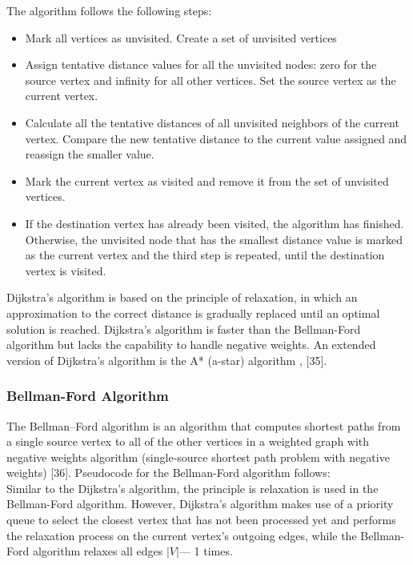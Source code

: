 \documentclass[10pt,11pt,12pt,oneside]{book}
\begin{document}
	The algorithm follows the following steps:\\
	\begin{itemize}
		\item {Mark all vertices as unvisited. Create a set of unvisited vertices}
		\item {Assign tentative distance values for all the unvisited nodes: zero for the source vertex and infinity for all other vertices. Set the source vertex as the current vertex.}
		\item {Calculate all the tentative distances of all unvisited neighbors of the current vertex. Compare the new tentative distance to the current value assigned and reassign the smaller value.}
		\item {Mark the current vertex as visited and remove it from the set of unvisited vertices.}
		\item {If the destination vertex has already been visited, the algorithm has finished. Otherwise, the unvisited node that has the smallest distance value is marked as the current vertex and the third step is repeated, until the destination vertex is visited. }
	\end{itemize}
	
	Dijkstra’s algorithm is based on the principle of relaxation, in which an approximation to the correct distance is gradually replaced until an optimal solution is reached. Dijkstra’s algorithm is faster than the Bellman-Ford algorithm but lacks the capability to handle negative weights. An extended version of Dijkstra’s algorithm is the A* (a-star) algorithm \cite{mehlhorn2008algorithms}, [35]. 
	
	\subsubsection{Bellman-Ford Algorithm}
	The Bellman–Ford algorithm is an algorithm that computes shortest paths from a single source vertex to all of the other vertices in a weighted graph with negative weights algorithm (single-source shortest path problem with negative weights) [36]. Pseudocode for the Bellman-Ford algorithm follows:\\
	
	Similar to the Dijkstra’s algorithm, the principle is relaxation is used in the Bellman-Ford algorithm. However, Dijkstra’s algorithm makes use of a priority queue to select the closest vertex that has not been processed yet and performs the relaxation process on the current vertex’s outgoing edges, while the Bellman-Ford algorithm relaxes all edges $|V|$— 1 times.
	
\end{document}
